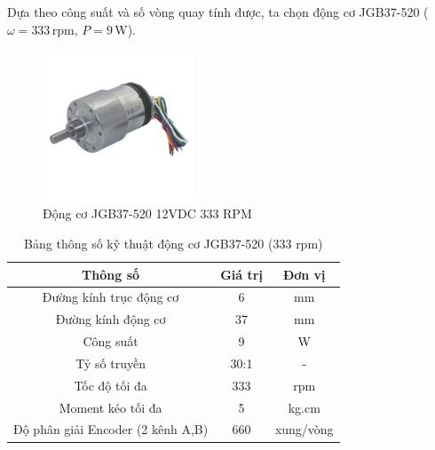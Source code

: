         \hspace*{0.6cm}Dựa theo công suất và số vòng quay tính được, ta chọn động cơ JGB37-520 ($\omega = 333 \,\mathrm{rpm}, \, P = 9 \,\mathrm{W}$).
        \begin{figure}[H]
            \centering
            \includegraphics[width=0.4\textwidth]{pictures/chapter3/motor.png}
            \caption{Động cơ JGB37-520 12VDC 333 RPM}
            \label{dc}
        \end{figure}
        \begin{table}[h]
            \centering
            \caption{Bảng thông số kỹ thuật động cơ JGB37-520 (333 rpm)}
            \begin{tabular}{|c|c|c|}
            \hline
            \textbf{Thông số} & \textbf{Giá trị} & \textbf{Đơn vị} \\
            \hline
            Đường kính trục động cơ & 6 & mm \\
            \hline
            Đường kính động cơ & 37 & mm \\
            \hline
            Công suất & 9 & W \\
            \hline
            Tỷ số truyền & 30:1 & - \\
            \hline
            Tốc độ tối đa & 333 & rpm \\
            \hline
            Moment kéo tối đa & 5 & kg.cm \\
            \hline
            Độ phân giải Encoder (2 kênh A,B) & 660 & xung/vòng \\
            \hline
            \end{tabular}
        \end{table}
